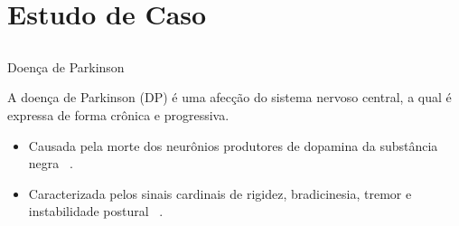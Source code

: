 \documentclass{beamer}
\begin{document}

\section{Estudo de Caso}
\subsection{}
\begin{frame}{Doença de Parkinson}
  \begin{block}{}
    A doença de Parkinson (DP) é uma afecção do sistema nervoso central, a qual é expressa de forma crônica e progressiva. 
      \begin{itemize}[<+->]
       \item Causada pela morte dos neurônios produtores de dopamina da substância negra ~\cite{protpar010}. 
       \item Caracterizada pelos sinais cardinais de rigidez, bradicinesia, tremor e instabilidade postural ~\cite{menezes2003}.
      \end{itemize}
  \end{block}

  
\end{frame}
\end{document}
